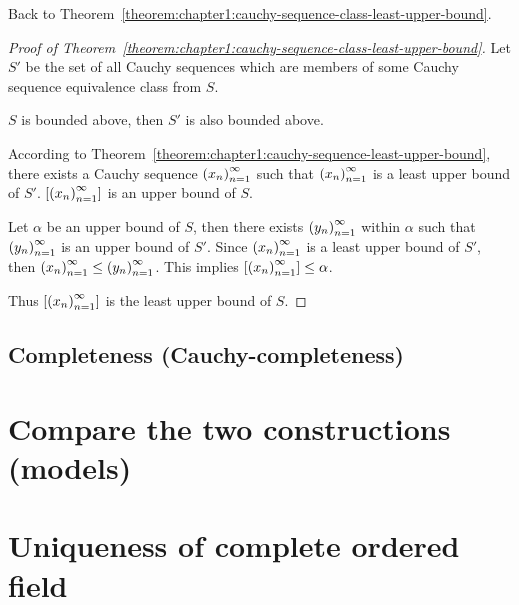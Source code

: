 Back to Theorem~\ref{theorem:chapter1:cauchy-sequence-class-least-upper-bound}.

\begin{proof}[Proof of Theorem~\ref{theorem:chapter1:cauchy-sequence-class-least-upper-bound}]
    Let $S'$ be the set of all Cauchy sequences which are members of some Cauchy sequence equivalence class from $S$.

    $S$ is bounded above, then $S'$ is also bounded above.

    According to Theorem~\ref{theorem:chapter1:cauchy-sequence-least-upper-bound}, there exists a Cauchy sequence ${\left({x_{n}}\right)}^{\infty}_{n=1}$ such that ${\left({x_{n}}\right)}^{\infty}_{n=1}$ is a least upper bound of $S'$. $\left[{{\left({x_{n}}\right)}^{\infty}_{n=1}}\right]$ is an upper bound of $S$.

    Let $\alpha$ be an upper bound of $S$, then there exists ${\left({y_{n}}\right)}^{\infty}_{n=1}$ within $\alpha$ such that ${\left({y_{n}}\right)}^{\infty}_{n=1}$ is an upper bound of $S'$. Since ${\left({x_{n}}\right)}^{\infty}_{n=1}$ is a least upper bound of $S'$, then ${\left({x_{n}}\right)}^{\infty}_{n=1} \le {\left({y_{n}}\right)}^{\infty}_{n=1}$. This implies $\left[{{\left({x_{n}}\right)}^{\infty}_{n=1}}\right] \le \alpha$.

    Thus $\left[{{\left({x_{n}}\right)}^{\infty}_{n=1}}\right]$ is the least upper bound of $S$.
\end{proof}

\subsection{Completeness (Cauchy-completeness)}

\section{Compare the two constructions (models)}

\section{Uniqueness of complete ordered field}

